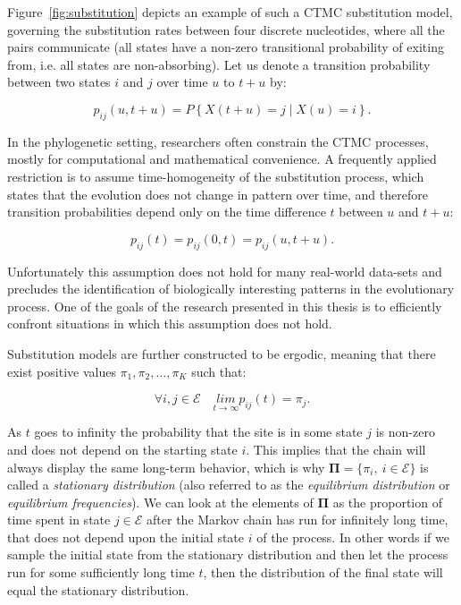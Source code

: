 Figure~\ref{fig:substitution} depicts an example of such a CTMC substitution model, governing the substitution rates between four discrete nucleotides, where all the pairs communicate (all states have a non-zero transitional probability of exiting from, i.e. all states are non-absorbing).
Let us denote a transition probability between two states $i$ and $j$ over time $u$ to $t+u$ by:

\begin{equation}
p_{ij}\left(u,t+u\right)=P\left\{ X(t+u)=j\mid X(u)=i\right\} .
\end{equation}

In the phylogenetic setting, researchers often constrain the CTMC processes, mostly for computational and mathematical convenience.
A frequently applied restriction is to assume time-homogeneity of the substitution process, which states that the evolution does not change in pattern over time, and therefore transition probabilities depend only on the time difference $t$ between $u$ and $t + u$:

\begin{equation}
p_{ij}\left(t\right) = p_{ij}\left(0,t\right) = p_{ij}\left(u,t+u\right).
\label{eq:time_homogeneity}
\end{equation}

Unfortunately this assumption does not hold for many real-world data-sets and precludes the identification of biologically interesting patterns in the evolutionary process. %
One of the goals of the research presented in this thesis is to efficiently confront situations in which this assumption does not hold.

Substitution models are further constructed to be ergodic, meaning that there exist positive values $\pi_{1},\pi_{2},\ldots,\pi_{K}$ such that:

\begin{equation}
\forall i,j\in \mathcal{E}  \quad\underset{t\rightarrow\infty}{lim}p_{ij}(t)=\pi_{j}.
\label{eq:ergodicity}
\end{equation}


As $t$ goes to infinity the probability that the site is in some state $j$ is non-zero and does not depend on the starting state $i$.
This implies that the chain will always display the same long-term behavior, which is why $\mathbf{\Pi}=\{\pi_{i},\ i\in\mathcal{E}\}$ is called a \emph{stationary distribution} (also referred to as the \emph{equilibrium distribution} or \emph{equilibrium frequencies}).
We can look at the elements of $\mathbf{\Pi}$ as the proportion of time spent in state $j\in\mathcal{E}$ after the Markov chain has run for infinitely long time, that does not depend upon the initial state $i$ of the process.
In other words if we sample the initial state from the stationary distribution and then let the process run for some sufficiently long time $t$, then the distribution of the final state will equal the stationary distribution. 

